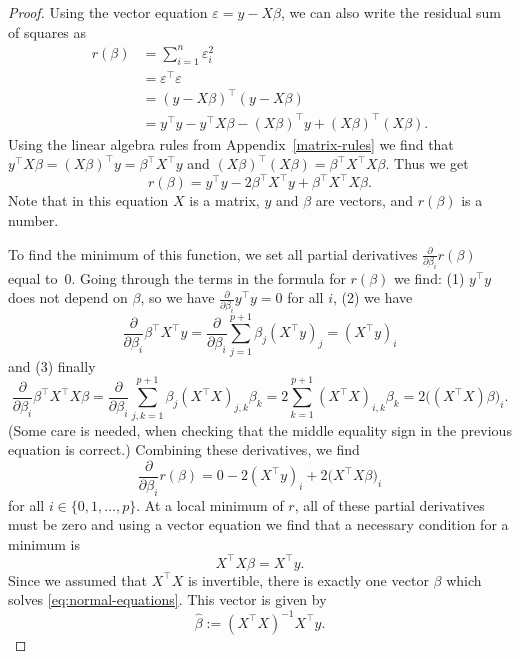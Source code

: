 \documentclass[
  a4paper,
]{article}
\theoremstyle{definition}
\theoremstyle{definition}
\theoremstyle{definition}
\theoremstyle{definition}
\theoremstyle{remark}
\begin{document}
\begin{proof}
Using the vector equation \(\varepsilon= y - X \beta\), we can also write the
residual sum of squares as
\begin{align*}
    r(\beta)
    &= \sum_{i=1}^n \varepsilon_i^2 \\
    &= \varepsilon^\top \varepsilon\\
    &= (y - X \beta)^\top (y - X \beta) \\
    &= y^\top y - y^\top X\beta - (X\beta)^\top y + (X\beta)^\top (X\beta).
  \end{align*}
Using the linear algebra rules from Appendix~\ref{matrix-rules} we find
that \(y^\top X\beta = (X\beta)^\top y = \beta^\top X^\top y\)
and \((X\beta)^\top (X\beta) = \beta^\top X^\top X \beta\). Thus we get
\begin{equation*}
    r(\beta)
    = y^\top y - 2\beta^\top X^\top y + \beta^\top X^\top X \beta.
  \end{equation*}
Note that in this equation \(X\) is a matrix, \(y\) and \(\beta\) are vectors,
and \(r(\beta)\) is a number.

To find the minimum of this function, we set all partial derivatives
\(\frac{\partial}{\partial \beta_i} r(\beta)\) equal to~\(0\). Going through the terms in
the formula for \(r(\beta)\) we find: (1) \(y^\top y\) does not depend on \(\beta\),
so we have \(\frac{\partial}{\partial \beta_i} y^\top y = 0\) for all \(i\), (2) we have
\begin{equation*}
    \frac{\partial}{\partial \beta_i} \beta^\top X^\top y
    = \frac{\partial}{\partial \beta_i} \sum_{j=1}^{p+1} \beta_j (X^\top y)_j
    = (X^\top y)_i
  \end{equation*}
and (3) finally
\begin{equation*}
    \frac{\partial}{\partial \beta_i} \beta^\top X^\top X \beta
    = \frac{\partial}{\partial \beta_i} \sum_{j,k=1}^{p+1} \beta_j (X^\top X)_{j,k} \beta_k
    = 2 \sum_{k=1}^{p+1} (X^\top X)_{i,k} \beta_k
    = 2 \bigl( (X^\top X) \beta \bigr)_i.
  \end{equation*}
(Some care is needed, when checking that the middle equality sign in
the previous equation is correct.)
Combining these derivatives, we find
\begin{equation}
    \frac{\partial}{\partial \beta_i} r(\beta)
    = 0 - 2 (X^\top y)_i + 2 \bigl( X^\top X \beta \bigr)_i
                           \label{eq:normal-first}
  \end{equation}
for all \(i \in \{0, 1, \ldots, p\}\). At a local minimum of \(r\),
all of these partial derivatives must be zero and using a vector
equation we find that a necessary condition for a minimum is
\begin{equation}
    X^\top X \beta = X^\top y.  \label{eq:normal-equations}
  \end{equation}
Since we assumed that \(X^\top X\) is invertible, there is exactly
one vector \(\beta\) which solves \eqref{eq:normal-equations}. This
vector is given by
\begin{equation*}
    \hat\beta
    := (X^\top X)^{-1} X^\top y.
  \end{equation*}


\end{proof}
\end{document}
